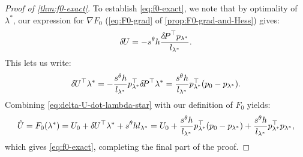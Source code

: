 \documentclass[sisc-eikonal.tex]{subfiles}
\begin{document}
\begin{proof}[Proof of \cref{thm:f0-exact}]
  To establish \cref{eq:f0-exact}, we note that by optimality of
  $\lambda^*$, our expression for $\nabla F_0$ (\cref{eq:F0-grad} of
  \cref{prop:F0-grad-and-Hess}) gives:
  \begin{equation}
    {\delta \hspace{-0.09em} U} = -s^\theta h \frac{{\delta \hspace{-0.14em} P}^\top p_{\lambda^*}}{l_{\lambda^*}}.
  \end{equation}
  This lets us write:
  \begin{equation}\label{eq:delta-U-dot-lambda-star}
    \delU^\top \lambda^* = -\frac{s^\theta h}{l_{\lambda^*}} p_{\lambda^*}^\top \delP^\top \lambda^* = \frac{s^\theta h}{l_{\lambda^*}} p_{\lambda^*}^\top {(p_0 - p_{\lambda^*})}.
  \end{equation}
  Combining \cref{eq:delta-U-dot-lambda-star} with our definition of
  $F_0$ yields:
  \begin{equation}
    \hat{U} = F_0(\lambda^*) = U_0 + {\delta \hspace{-0.09em} U}^\top \lambda^* + s^\theta h l_{\lambda^*} = U_0 + \frac{s^\theta h}{l_{\lambda^*}} p_{\lambda^*}^\top {(p_0 - p_{\lambda^*})} + \frac{s^\theta h}{l_{\lambda^*}} p_{\lambda^*}^\top p_{\lambda^*},
  \end{equation}
  which gives \cref{eq:f0-exact}, completing the final part of the
  proof.
\end{proof}
\end{document}
